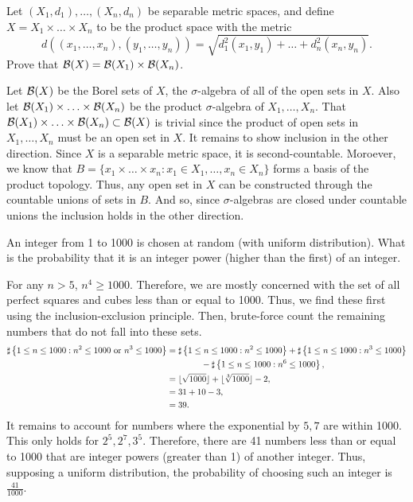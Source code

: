 \begin{problem}{12}
    Let $(X_1, d_1), \ldots, (X_n,d_n)$ be separable metric spaces, and define $X = X_1\times \ldots \times X_n$ to be the product space with the metric \[
        d((x_1,\ldots,x_n), (y_1,\ldots,y_n)) = \sqrt{d_1^2(x_1,y_1) + \ldots + d_n^2(x_n,y_n)}.
    \]
    Prove that $\mathcal{B}(X) = \mathcal{B}(X_1) \times \mathcal{B}(X_n)$.
\end{problem}
\begin{solution}
    Let $\mathcal{B}(X)$ be the Borel sets of $X$, the $\sigma$-algebra of all of the open sets in $X$. Also let $\mathcal{B}(X_1) \times \ldots \times \mathcal{B}(X_n)$ be the product $\sigma$-algebra of $X_1,\ldots,X_n$. That $\mathcal{B}(X_1) \times \ldots \times \mathcal{B}(X_n) \subset \mathcal{B}(X)$ is trivial since the product of open sets in $X_1, \ldots, X_n$ must be an open set in $X$. It remains to show inclusion in the other direction. Since $X$ is a separable metric space, it is second-countable. Moroever, we know that $B = \{x_1 \times \ldots \times x_n : x_1 \in X_1,\ldots,x_n \in X_n\}$ forms a basis of the product topology. Thus, any open set in $X$ can be constructed through the countable unions of sets in $B$. And so, since $\sigma$-algebras are closed under countable unions the inclusion holds in the other direction.
\end{solution}
\begin{problem}{13}
    An integer from 1 to 1000 is chosen at random (with uniform distribution). What is the probability that it is an integer power (higher than the first) of an integer.
\end{problem}
\begin{solution}
    For any $n > 5$, $n^4 \geq 1000$. Therefore, we are mostly concerned with the set of all perfect squares and cubes less than or equal to 1000. Thus, we find these first using the inclusion-exclusion principle. Then, brute-force count the remaining numbers that do not fall into these sets. 
    \begin{align*}
        \sharp\left\{ 1 \leq n \leq 1000: n^2 \leq 1000~\text{or}~n^3 \leq 1000 \right\} &= \sharp \left\{ 1 \leq n \leq 1000: n^2 \leq 1000 \right\} + \sharp \left\{ 1 \leq n \leq 1000: n^3 \leq 1000 \right\} \\ &\qquad\qquad - \sharp\left\{ 1 \leq n \leq 1000: n^6 \leq 1000 \right\}, \\
        &= \lfloor \sqrt{1000} \rfloor + \lfloor \sqrt[3]{1000} \rfloor - 2, \\
        &= 31 + 10 - 3, \\
        &= 39.
    \end{align*}
    It remains to account for numbers where the exponential by $5,7$ are within 1000. This only holds for $2^5,2^7,3^5$. Therefore, there are 41 numbers less than or equal to 1000 that are integer powers (greater than 1) of another integer. Thus, supposing a uniform distribution, the probability of choosing such an integer is $\frac{41}{1000}$.
\end{solution}
